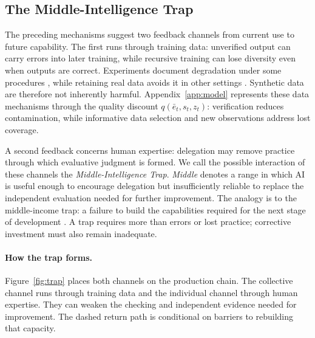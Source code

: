 \documentclass[12pt]{article}
\theoremstyle{plain}
\theoremstyle{definition}
\theoremstyle{remark}
\begin{document}
\subsection{The Middle-Intelligence Trap}\label{subsec:trap}

The preceding mechanisms suggest two feedback channels from current use
to future capability. The first runs through training data: unverified
output can carry errors into later training, while recursive training
can lose diversity even when outputs are correct. Experiments document
degradation under some procedures
\citep{Shumailov2024}, while retaining real data avoids it in other
settings \citep{GerstgrasserEtAl2024Accumulate}. Synthetic data are
therefore not inherently harmful. Appendix~\ref{app:model} represents
these data mechanisms through the quality discount $q(\bar e_t,s_t,z_t)$:
verification reduces contamination, while informative data selection
and new observations address lost coverage.

A second feedback concerns human expertise: delegation may remove
practice through which evaluative judgment is formed. We call the
possible interaction of these channels the \emph{Middle-Intelligence
Trap}. \emph{Middle} denotes a range in which AI is useful enough to
encourage delegation but insufficiently reliable to replace the
independent evaluation needed for further improvement. The analogy is
to the middle-income trap: a failure to build the capabilities required
for the next stage of development \citep{GillKharas2007}. A trap
requires more than errors or lost
practice; corrective investment must also remain inadequate.

\paragraph{How the trap forms.}
Figure~\ref{fig:trap} places both channels on the production chain.
The collective channel runs through training data and the individual
channel through human expertise. They can weaken the checking and
independent evidence needed for improvement. The dashed return path is
conditional on barriers to rebuilding that capacity.
\end{document}
